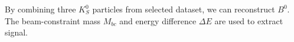 By combining three $K_S^0$ particles from selected dataset, we can reconstruct $B^0$. The beam-constraint mass $M_{bc}$ and energy difference $\Delta E$ are used to extract signal. 
